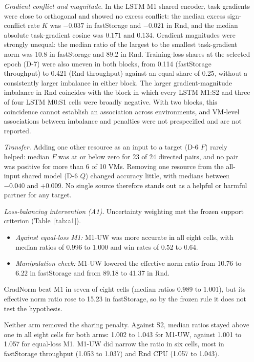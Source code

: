 \documentclass[5p,twocolumn]{elsarticle}
\begin{document}
\emph{Gradient conflict and magnitude.} In the LSTM M1 shared encoder, task
gradients were close to orthogonal and showed no excess conflict: the median
excess sign-conflict rate $K$ was $-0.037$ in fastStorage and $-0.021$ in Rnd,
and the median absolute task-gradient cosine was 0.171 and 0.134. Gradient
magnitudes were strongly unequal: the median ratio of the largest to the
smallest task-gradient norm was 10.8 in fastStorage and 89.2 in Rnd.
Training-loss shares at the selected epoch (D-7) were also uneven in both
blocks, from 0.114 (fastStorage throughput) to 0.421 (Rnd throughput)
against an equal share of 0.25, without a consistently larger imbalance in
either block. The larger gradient-magnitude imbalance in Rnd coincides with
the block in
which every LSTM M1:S2 and three of four LSTM M0:S1 cells were broadly
negative. With two blocks, this coincidence cannot establish an association
across environments, and VM-level associations between imbalance and
penalties were not prespecified and are not reported.

\emph{Transfer.} Adding one other resource as an input to a target (D-6 $F$)
rarely helped: median $F$ was at or below zero for 23 of 24 directed pairs,
and no pair was positive for more than 6 of 10 VMs. Removing one resource from
the all-input shared model (D-6 $Q$) changed accuracy little, with medians
between $-0.040$ and $+0.009$. No single source therefore stands out as a
helpful or harmful partner for any target.

\emph{Loss-balancing intervention (A1).} Uncertainty weighting met the
frozen support criterion (Table~\ref{tab:a1}).
\begin{itemize}
  \item \emph{Against equal-loss M1:} M1-UW was more accurate in all eight
    cells, with median ratios of 0.996 to 1.000 and win rates of 0.52 to
    0.64.
  \item \emph{Manipulation check:} M1-UW lowered the effective norm ratio from
    10.76 to 6.22 in fastStorage and from 89.18 to 41.37 in Rnd.
\end{itemize}
GradNorm beat M1 in seven of eight cells (median ratios 0.989 to 1.001), but
its effective norm ratio rose to 15.23 in fastStorage, so by the frozen rule
it does not test the hypothesis.

Neither arm removed the sharing penalty. Against S2, median ratios stayed
above one in all eight cells for both arms: 1.002 to 1.043 for M1-UW, against
1.001 to 1.057 for equal-loss M1. M1-UW did narrow the ratio in six cells,
most in fastStorage throughput (1.053 to 1.037) and Rnd CPU (1.057 to 1.043).
\end{document}
